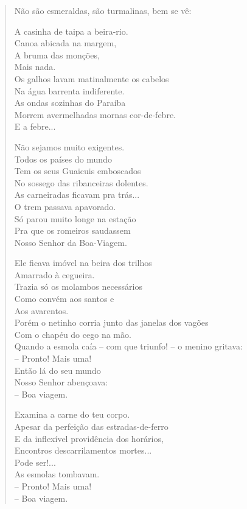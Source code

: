 \begin{verse}
Não são esmeraldas, são turmalinas, bem se vê:

A casinha de taipa a beira-rio.\\
Canoa abicada na margem,\\
A bruma das monções,\\
Mais nada.\\
Os galhos lavam matinalmente os cabelos\\
Na água barrenta indiferente.\\
As ondas sozinhas do Paraíba\\
Morrem avermelhadas mornas cor-de-febre.\\
E a febre...

Não sejamos muito exigentes.\\
Todos os países do mundo\\
Tem os seus Guaicuis emboscados\\
No sossego das ribanceiras dolentes.\\
As carneiradas ficavam pra trás...\\
O trem passava apavorado.\\
Só parou muito longe na estação\\
Pra que os romeiros saudassem\\
Nosso Senhor da Boa-Viagem.

Ele ficava imóvel na beira dos trilhos\\
Amarrado à cegueira.\\
Trazia só os molambos necessários\\
Como convém aos santos e\\
Aos avarentos.\\
Porém o netinho corria junto das janelas dos vagões\\
Com o chapéu do cego na mão.\\
Quando a esmola caía -- com que triunfo! -- o menino gritava:\\
-- Pronto! Mais uma!\\
Então lá do seu mundo\\
Nosso Senhor abençoava:\\
-- Boa viagem.

Examina a carne do teu corpo.\\
Apesar da perfeição das estradas-de-ferro\\
E da inflexível providência dos horários,\\
Encontros descarrilamentos mortes...\\
Pode ser!...\\
As esmolas tombavam.\\
-- Pronto! Mais uma!\\
-- Boa viagem.


\end{verse}
